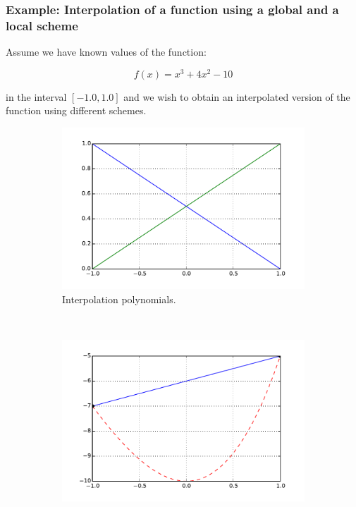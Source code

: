\subsubsection*{Example: Interpolation of a function using a global and a local scheme}
Assume we have known values of the function:

\[f(x) = {x^3} + 4{x^2} - 10\]

in the interval $[-1.0, 1.0]$ and we wish to obtain an interpolated version of the function using different schemes.


\begin{figure}[H]
\centering
	\begin{subfigure}[b]{0.45\textwidth}\qquad
		\includegraphics[width=\textwidth]{lineal.pdf}
		\caption{Interpolation polynomials. }
	\end{subfigure}\,
%
	\begin{subfigure}[b]{0.45\textwidth}\qquad
		\includegraphics[width=\textwidth]{interlin.pdf}

\end{subfigure}
\end{figure}
